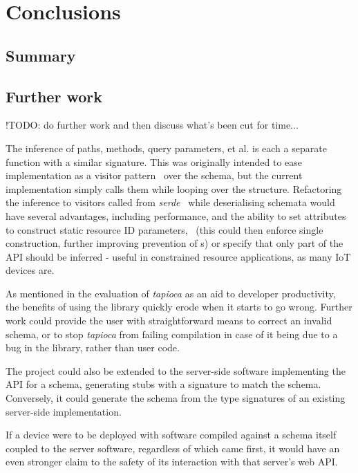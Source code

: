 \section{Conclusions} \label{concl}

\subsection{Summary} \label{concl:summary}

\subsection{Further work} \label{concl:further}

!TODO: do further work and then discuss what's been cut for time...

The inference of paths, methods, query parameters, et al. is each a separate function with a similar signature. This was originally intended to ease implementation as a visitor pattern~\cite{visitor_pattern} over the schema, but the current implementation simply calls them while looping over the structure. Refactoring the inference to visitors called from \emph{serde}~\cite{serde} while deserialising schemata would have several advantages, including performance, and the ability to set attributes~ to construct static resource ID parameters,~ (this could then enforce single construction, further improving prevention of s) or specify that only part of the API should be inferred - useful in constrained resource applications, as many IoT devices are.

As mentioned in the evaluation of \emph{tapioca} as an aid to developer productivity,~ the benefits of using the library quickly erode when it starts to go wrong. Further work could provide the user with straightforward means to correct an invalid schema, or to stop \emph{tapioca} from failing compilation in case of it being due to a bug in the library, rather than user code.

The project could also be extended to the server-side software implementing the API for a schema, generating stubs with a signature to match the schema. Conversely, it could generate the schema from the type signatures of an existing server-side implementation.

If a device were to be deployed with software compiled against a schema itself coupled to the server software, regardless of which came first, it would have an even stronger claim to the safety of its interaction with that server's web API.